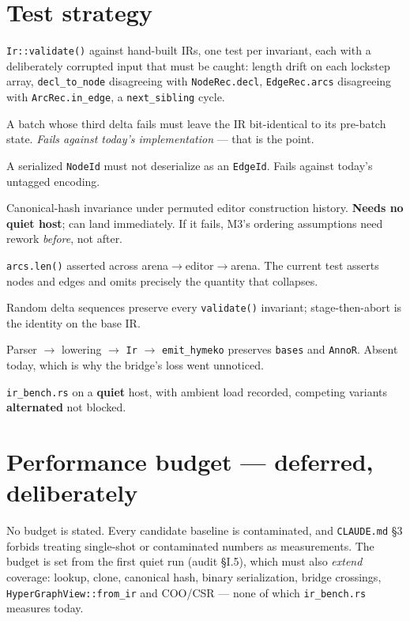 \documentclass[11pt,a4paper]{article}
\newcommand{\code}[1]{\texttt{#1}}
\begin{document}
\section{Test strategy}

\begin{description}\itemsep3pt
\item[Unit] \code{Ir::validate()} against hand-built IRs, one test per
  invariant, each with a deliberately corrupted input that must be caught:
  length drift on each lockstep array, \code{decl\_to\_node} disagreeing with
  \code{NodeRec.decl}, \code{EdgeRec.arcs} disagreeing with
  \code{ArcRec.in\_edge}, a \code{next\_sibling} cycle.
\item[Regression (M0.1)] A batch whose third delta fails must leave the IR
  bit-identical to its pre-batch state. \emph{Fails against today's
  implementation} --- that is the point.
\item[Regression (M1)] A serialized \code{NodeId} must not deserialize as an
  \code{EdgeId}. Fails against today's untagged encoding.
\item[Correctness (M0.5)] Canonical-hash invariance under permuted editor
  construction history. \textbf{Needs no quiet host}; can land immediately. If
  it fails, M3's ordering assumptions need rework \emph{before}, not after.
\item[Round-trip (M5 gate)] \code{arcs.len()} asserted across
  arena$\to$editor$\to$arena. The current test asserts nodes and edges and
  omits precisely the quantity that collapses.
\item[Property (\code{proptest})] Random delta sequences preserve every
  \code{validate()} invariant; stage-then-abort is the identity on the base IR.
\item[Integration] Parser $\to$ lowering $\to$ \code{Ir} $\to$
  \code{emit\_hymeko} preserves \code{bases} and \code{AnnoR}. Absent today,
  which is why the bridge's loss went unnoticed.
\item[Performance] \code{ir\_bench.rs} on a \textbf{quiet} host, with ambient
  load recorded, competing variants \textbf{alternated} not blocked.
\end{description}

\section{Performance budget --- deferred, deliberately}

No budget is stated. Every candidate baseline is contaminated, and
\code{CLAUDE.md} \S3 forbids treating single-shot or contaminated numbers as
measurements. The budget is set from the first quiet run (audit \S I.5), which
must also \emph{extend} coverage: lookup, clone, canonical hash, binary
serialization, bridge crossings, \code{HyperGraphView::from\_ir} and COO/CSR ---
none of which \code{ir\_bench.rs} measures today.
\end{document}

